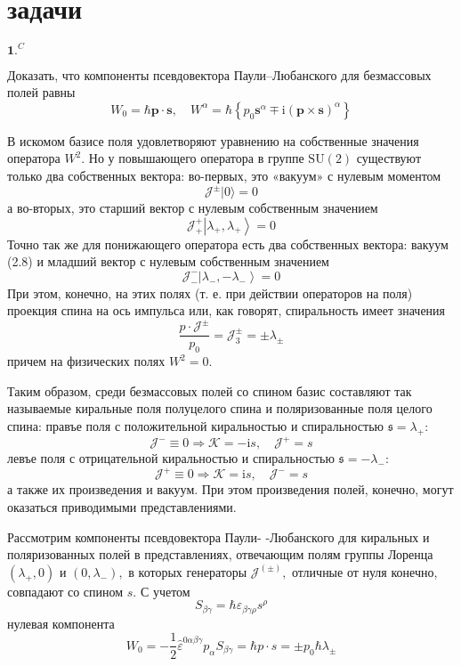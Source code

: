 \documentclass[a4paper,12pt]{article} %
\begin{document}
\section{задачи}


\begin{ttask}$\mathbf{1.}^{C}$ 

Доказать, что компоненты псевдовектора Паули–Любанского для
безмассовых полей равны
$$
W_{0}=
\hbar \boldsymbol{p} \cdot \boldsymbol{s}, 
\quad 
W^{\alpha}=
\hbar\left\{p_{0} \boldsymbol{s}^{\alpha} \mp \mathrm{i}(\boldsymbol{p} \times \boldsymbol{s})^{\alpha}\right\}
$$


В искомом базисе поля удовлетворяют уравнению на собственные значения оператора $W^{2}$. Но у повышающего оператора в группе $\mathrm{SU}(2)$ существуют только два собственных вектора: во-первых, это «вакуум» с нулевым моментом
$$
\mathcal{J}^{\pm}|0\rangle=0
$$
а во-вторых, это старший вектор с нулевым собственным значением
$$
\mathcal{J}_{+}^{+}\left|\lambda_{+}, \lambda_{+}\right\rangle=0
$$
Точно так же для понижающего оператора есть два собственных вектора:
вакуум (2.8) и младший вектор с нулевым собственным значением
$$
\mathcal{J}_{-}^{-}\left|\lambda_{-},-\lambda_{-}\right\rangle=0
$$
При этом, конечно, на этих полях (т. е. при действии операторов на поля)
проекция спина на ось импульса или, как говорят, спиральность имеет значения
$$
\frac{p \cdot \mathcal{J}^{\pm}}{p_{0}}=\mathcal{J}_{3}^{\pm}=\pm \lambda_{\pm}
$$
причем на физических полях $W^{2}=0 .$


Таким образом, среди безмассовых полей со спином базис составляют так называемые киральные поля полуцелого спина и поляризованные поля целого спина:
правъе поля с положительной киральностью и спиральностью $\mathfrak{s}=\lambda_{+}:$
$$
\mathcal{J}^{-} \equiv 0 \Rightarrow \mathcal{K}=-\mathrm{i} s, \quad \mathcal{J}^{+}=s
$$
левъе поля с отрицательной киральностью и спиральностью $\mathfrak{s}=-\lambda_{-}:$
$$
\mathcal{J}^{+} \equiv 0 \Rightarrow \mathcal{K}=\mathrm{i} s, \quad \mathcal{J}^{-}=s
$$
а также их произведения и вакуум. При этом произведения полей, конечно, могут оказаться приводимыми представлениями.

Рассмотрим компоненты псевдовектора Паули- -Любанского для киральных и поляризованных полей в представлениях, отвечающим полям группы Лоренца $\left(\lambda_{+}, 0\right)$ и $\left(0, \lambda_{-}\right),$ в которых генераторы $\mathcal{J}^{(\pm)},$ отличные от нуля конечно, совпадают со спином $s .$ С учетом
$$
S_{\beta \gamma}=\hbar \varepsilon_{\beta \gamma \rho} s^{\rho}
$$
нулевая компонента
$$
W_{0}=-\frac{1}{2} \hat{\varepsilon}^{0 \alpha \beta \gamma} p_{\alpha} S_{\beta \gamma}=\hbar p \cdot s=\pm p_{0} \hbar \lambda_{\pm}
$$



\end{ttask}
\end{document}
